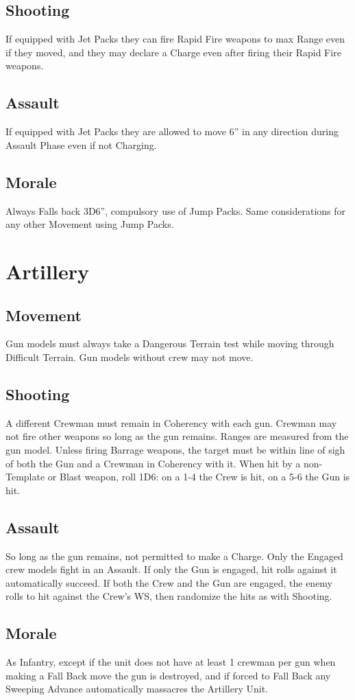 \subsection{Shooting}
If equipped with Jet Packs they can fire Rapid Fire weapons to
max Range even if they moved, and they may declare a
Charge even after firing their Rapid Fire weapons.
\subsection{Assault}
If equipped with Jet Packs they are allowed to move 6” in any
direction during Assault Phase even if not Charging.
\subsection{Morale}
Always Falls back 3D6”, compulsory use of Jump Packs.
Same considerations for any other Movement using Jump
Packs.
\section{Artillery}
\subsection{Movement}
Gun models must always take a Dangerous Terrain test while
moving through Difficult Terrain. Gun models without crew
may not move.
\subsection{Shooting}
A different Crewman must remain in Coherency with each gun.
Crewman may not fire other weapons so long as the gun
remains. Ranges are measured from the gun model. Unless
firing Barrage weapons, the target must be within line of sigh
of both the Gun and a Crewman in Coherency with it. When hit
by a non-Template or Blast weapon, roll 1D6: on a 1-4 the
Crew is hit, on a 5-6 the Gun is hit.
\subsection{Assault}
So long as the gun remains, not permitted to make a Charge.
Only the Engaged crew models fight in an Assault. If only the
Gun is engaged, hit rolls against it automatically succeed. If
both the Crew and the Gun are engaged, the enemy rolls to hit
against the Crew's WS, then randomize the hits as with
Shooting.
\subsection{Morale}
As Infantry, except if the unit does not have at least 1 crewman
per gun when making a Fall Back move the gun is destroyed,
and if forced to Fall Back any Sweeping Advance
automatically massacres the Artillery Unit.

